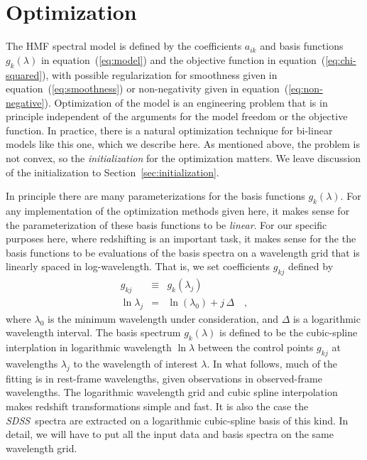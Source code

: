 \documentclass[12pt,preprint]{aastex}
\newcommand{\project}[1]{\textsl{#1}}
\newcommand{\sdss}{\project{SDSS}}
\newcommand{\sectionname}{Section}
\newcommand{\equationname}{equation}
\begin{document}
\section{Optimization}\label{sec:optimization}

The HMF spectral model is defined by the coefficients $a_{ik}$ and basis
functions $g_k(\lambda)$ in \equationname~(\ref{eq:model}) and the
objective function in \equationname~(\ref{eq:chi-squared}), with possible
regularization for smoothness given in
\equationname~(\ref{eq:smoothness}) or non-negativity given in
\equationname~(\ref{eq:non-negative}).  Optimization of the model is an
engineering problem that is in principle independent of the arguments
for the model freedom or the objective function.  In practice, there
is a natural optimization technique for bi-linear models like this
one, which we describe here.  As mentioned above, the problem is not
convex, so the \emph{initialization} for the optimization matters.  We
leave discussion of the initialization to
\sectionname~\ref{sec:initialization}.

In principle there are many parameterizations for the basis functions
$g_k(\lambda)$.  For any implementation of the optimization methods
given here, it makes sense for the parameterization of these basis
functions to be \emph{linear}.  For our specific purposes here, where
redshifting is an important task, it makes sense for the the basis
functions to be evaluations of the basis spectra on a wavelength grid
that is linearly spaced in log-wavelength.  That is, we set
coefficients $g_{kj}$ defined by
\begin{eqnarray}\displaystyle
g_{kj} & \equiv & g_k(\lambda_j) \nonumber\\
\ln\lambda_j & = & \ln(\lambda_0) + j\,\Delta
\quad ,
\end{eqnarray}
where $\lambda_0$ is the minimum wavelength under consideration, and
$\Delta$ is a logarithmic wavelength interval.  The basis spectrum
$g_k(\lambda)$ is defined to be the cubic-spline interplation in
logarithmic wavelength $\ln\lambda$ between the control points
$g_{kj}$ at wavelengths $\lambda_j$ to the wavelength of interest
$\lambda$.  In what follows, much of the fitting is in rest-frame
wavelengths, given observations in observed-frame wavelengths.  The
logarithmic wavelength grid and cubic spline interpolation makes
redshift transformations simple and fast.  It is also the case the
\sdss\ spectra are extracted on a logarithmic cubic-spline basis of
this kind.  In detail, we will have to put all the input data and
basis spectra on the same wavelength grid.
\end{document}
